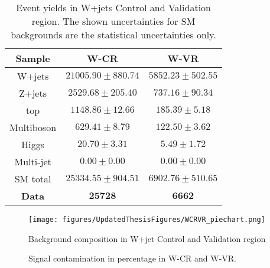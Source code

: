 \begin{table}
  \centering
\begin{tabular}{|c|c|c|}
\hline
Sample & W-CR & W-VR\tabularnewline
\hline
\hline
W+jets & $ 21005.90 \pm 880.74 $ & $ 5852.23 \pm 502.55 $\tabularnewline
\hline
Z+jets  & $ 2529.68 \pm 205.40 $& $ 737.16 \pm 90.34 $\tabularnewline
\hline
top & $ 1148.86 \pm 12.66 $ & $ 185.39 \pm 5.18 $\tabularnewline
\hline
Multiboson & $ 629.41 \pm 8.79 $ & $ 122.50 \pm 3.62 $\tabularnewline
\hline
Higgs & $ 20.70 \pm 3.31 $ & $ 5.49 \pm 1.72 $\tabularnewline
\hline
Multi-jet & $0.00\pm0.00$ & $0.00\pm0.00$\tabularnewline
\hline
\hline
SM total & $ 25334.55 \pm 904.51 $ & $ 6902.76 \pm 510.65 $\tabularnewline
\hline
\textbf{Data} & \textbf{$\mathbf{25728}$} & $\mathbf{6662}$\tabularnewline
\hline
\end{tabular}
\caption{Event yields in W+jets Control and Validation region. The shown uncertainties for SM backgrounds are the statistical
uncertainties only.  \label{tab:bkgestimation:WCRVRyields}}
\end{table}

\begin{figure}[!htpb]
\centering
  \texttt{[image: figures/UpdatedThesisFigures/WCRVR\_piechart.png]}
  \caption{Background composition in W+jet Control and Validation region \label{fig:bkgestimation:WCRVRpurity}}\end{figure}


\begin{figure}[!htpb]
  \centering
\caption{Signal contamination in percentage in W-CR and W-VR. \label{fig:SS:WCRVRcontamination}}
\end{figure}

